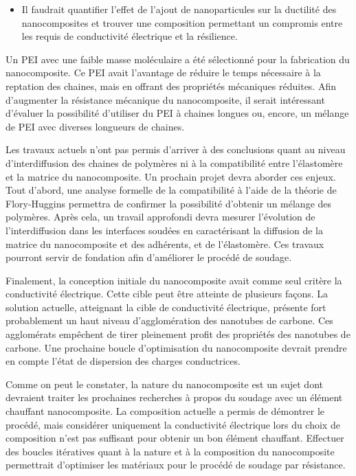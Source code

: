 \begin{itemize}
	\item Il faudrait quantifier l'effet de l'ajout de nanoparticules sur la ductilité des nanocomposites et trouver une composition permettant un compromis entre les requis de conductivité électrique et la résilience. 
\end{itemize}

Un PEI avec une faible masse moléculaire a été sélectionné pour la fabrication du nanocomposite. 
Ce PEI avait l'avantage de réduire le temps nécessaire à la reptation des chaines, mais en offrant des propriétés mécaniques réduites. 
Afin d'augmenter la résistance mécanique du nanocomposite, il serait intéressant d'évaluer la possibilité d'utiliser du PEI à chaines longues ou, encore, un mélange de PEI avec diverses longueurs de chaines. 

Les travaux actuels n'ont pas permis d'arriver à des conclusions quant au niveau d'interdiffusion des chaines de polymères ni à la compatibilité entre l'élastomère et la matrice du nanocomposite. 
Un prochain projet devra aborder ces enjeux. 
Tout d'abord, une analyse formelle de la compatibilité à l'aide de la théorie de Flory-Huggins permettra de confirmer la possibilité d'obtenir un mélange des polymères. 
Après cela, un travail approfondi devra mesurer l'évolution de l'interdiffusion dans les interfaces soudées en caractérisant la diffusion de la matrice du nanocomposite et des adhérents, et de l'élastomère. 
Ces travaux pourront servir de fondation afin d'améliorer le procédé de soudage. 

Finalement, la conception initiale du nanocomposite avait comme seul critère la conductivité électrique. 
Cette cible peut être atteinte de plusieurs façons. 
La solution actuelle, atteignant la cible de conductivité électrique, présente fort probablement un haut niveau d'agglomération des nanotubes de carbone. 
Ces agglomérats empêchent de tirer pleinement profit des propriétés des nanotubes de carbone. 
Une prochaine boucle d'optimisation du nanocomposite devrait prendre en compte l'état de dispersion des charges conductrices. 

Comme on peut le constater, la nature du nanocomposite est un sujet dont devraient traiter les prochaines recherches à propos du soudage avec un élément chauffant nanocomposite. 
La composition actuelle a permis de démontrer le procédé, mais considérer uniquement la conductivité électrique lors du choix de composition n'est pas suffisant pour obtenir un bon élément chauffant.
Effectuer des boucles itératives quant à la nature et à la composition du nanocomposite permettrait d'optimiser les matériaux pour le procédé de soudage par résistance. 

